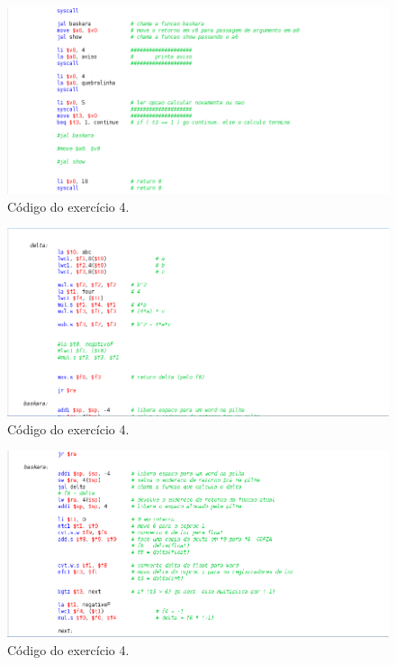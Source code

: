 \documentclass[12pt]{article}
\begin{document}
\begin{figure}[H]
	\centering
	\includegraphics[width=1\textwidth]{EX_4_3.png}
	\caption{Código do exercício 4.}
	\label{fig:hilo3}
\end{figure}

\begin{figure}[H]
	\centering
	\includegraphics[width=1\textwidth]{EX_4_4.png}
	\caption{Código do exercício 4.}
	\label{fig:hilo4}
\end{figure}

\begin{figure}[H]
	\centering
	\includegraphics[width=1\textwidth]{EX_4_5.png}
	\caption{Código do exercício 4.}
	\label{fig:hilo5}
\end{figure}
\end{document}
